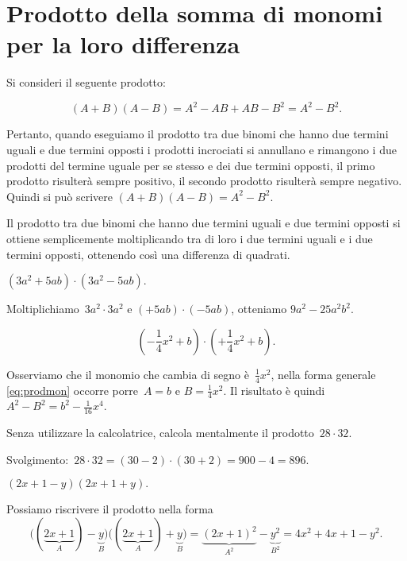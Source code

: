 \ovalbox{\risolvii \ref{ese:12.11}, \ref{ese:12.12}, \ref{ese:12.13}, \ref{ese:12.14}, \ref{ese:12.15}}

\section{Prodotto della somma di monomi per la loro differenza}\label{sect:differenza_di_quadrati}

Si consideri il seguente prodotto:

\begin{equation}\label{eq:prodmon}
 \left(A+B\right)\left(A-B\right)=A^{2}-{AB}+{AB}-B^{2}=A^{2}-B^{2}.
\end{equation}

Pertanto, quando eseguiamo il prodotto tra due binomi che hanno due
termini uguali e due termini opposti i prodotti incrociati si annullano
e rimangono i due prodotti del termine uguale per se stesso e dei due
termini opposti, il primo prodotto risulterà sempre positivo, il
secondo prodotto risulterà sempre negativo. Quindi si può scrivere
$\left(A+B\right)\left(A-B\right)=A^{2}-B^{2}$.

\osservazione Il prodotto tra due binomi che hanno due termini
uguali e due termini opposti si ottiene semplicemente moltiplicando tra
di loro i due termini uguali e i due termini opposti, ottenendo così una differenza di quadrati.

\begin{exrig}
 \begin{esempio}
$\left(3a^{2}+5{ab}\right)\cdot \left(3a^{2}-5{ab}\right).$

Moltiplichiamo~$3a^{2}\cdot 3a^{2}$ e
$\left(+5{ab}\right)\cdot\left(-5{ab}\right)$, otteniamo
$9a^{2}-25a^{2}b^{2}$.
 \end{esempio}

 \begin{esempio}
 \[\left(-{\frac{1}{4}}x^{2}+b\right)\cdot \left(+{\frac{1}{4}}x^{2}+b\right).\]

Osserviamo che il monomio che cambia di segno è~$\frac{1}{4}x^{2}$,
nella forma generale \eqref{eq:prodmon} occorre porre~$A=b$ e $B=\frac{1}{4}x^{2}$.
Il risultato è quindi~$A^{2}-B^{2}=b^{2}-\frac{1}{16}x^{4}$.
 \end{esempio}

 \begin{esempio}
 Senza utilizzare la calcolatrice, calcola mentalmente il prodotto~$28\cdot 32$.

Svolgimento:~$28\cdot 32=(30-2)\cdot(30+2)=900-4=896$.
 \end{esempio}

 \begin{esempio}
$(2x+1-y)(2x+1+y).$

Possiamo riscrivere il prodotto nella forma
\[\big((\underbrace{2x+1}_{A})-\underbrace{y}_{B}\big)\big((\underbrace{2x+1}_{A})+\underbrace{y}_{B}\big)=\underbrace{(2x+1)^{2}}_{A^{2}}-\underbrace{y^{2}}_{B^{2}}=4x^{2}+4x+1-y^{2}.\]
 \end{esempio}

\end{exrig}

